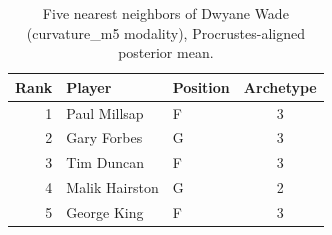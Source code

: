 \begin{table}[htbp]
  \centering\small
  \begin{tabular}{rllc}
    \toprule
    Rank & Player & Position & Archetype \\
    \midrule
    1 & Paul Millsap & F & 3 \\
    2 & Gary Forbes & G & 3 \\
    3 & Tim Duncan & F & 3 \\
    4 & Malik Hairston & G & 2 \\
    5 & George King & F & 3 \\
    \bottomrule
  \end{tabular}
  \caption{Five nearest neighbors of Dwyane Wade (curvature_m5 modality), Procrustes-aligned posterior mean.}
  \label{tab:Dwyane_Wade_neighbors_curvature_m5}
\end{table}


